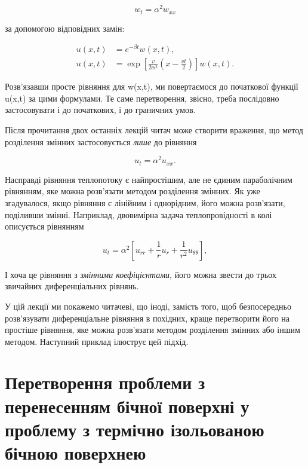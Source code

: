 \documentclass[
  ukrainian,
]{article}
\begin{document}
\[
w_t = \alpha^2 w_{xx}
\]

за допомогою відповідних замін:

\[
\begin{aligned}
u(x,t)&=e^{-\beta t}w(x,t),\\
u(x,t)&=\exp\!\left[\frac{v}{2\alpha^2}\!\left(x-\frac{vt}{2}\right)\right]w(x,t).
\end{aligned}
\]

Розв'язавши просте рівняння для w(x,t), ми повертаємося до початкової
функції u(x,t) за цими формулами. Те саме перетворення, звісно, треба
послідовно застосовувати і до початкових, і до граничних умов.

Після прочитання двох останніх лекцій читач може створити враження, що
метод розділення змінних застосовується \emph{лише} до рівняння

\[
u_t = \alpha^2 u_{xx}.
\]

Насправді рівняння теплопотоку є найпростішим, але не єдиним
параболічним рівнянням, яке можна розв'язати методом розділення змінних.
Як уже згадувалося, якщо рівняння є лінійним і однорідним, його можна
розв'язати, поділивши змінні. Наприклад, двовимірна задача
теплопровідності в колі описується рівнянням

\[
u_t = \alpha^2 \left[ u_{rr} + \frac{1}{r} u_r + \frac{1}{r^2} u_{\theta\theta} \right],
\]

І хоча це рівняння з \emph{змінними коефіцієнтами}, його можна звести до
трьох звичайних диференціальних рівнянь.

У цій лекції ми покажемо читачеві, що іноді, замість того, щоб
безпосередньо розв'язувати диференціальне рівняння в похідних, краще
перетворити його на простіше рівняння, яке можна розв'язати методом
розділення змінних або іншим методом. Наступний приклад ілюструє цей
підхід.

\section{Перетворення проблеми з перенесенням бічної поверхні у проблему
з термічно ізольованою бічною
поверхнею}\label{ux43fux435ux440ux435ux442ux432ux43eux440ux435ux43dux43dux44f-ux43fux440ux43eux431ux43bux435ux43cux438-ux437-ux43fux435ux440ux435ux43dux435ux441ux435ux43dux43dux44fux43c-ux431ux456ux447ux43dux43eux457-ux43fux43eux432ux435ux440ux445ux43dux456-ux443-ux43fux440ux43eux431ux43bux435ux43cux443-ux437-ux442ux435ux440ux43cux456ux447ux43dux43e-ux456ux437ux43eux43bux44cux43eux432ux430ux43dux43eux44e-ux431ux456ux447ux43dux43eux44e-ux43fux43eux432ux435ux440ux445ux43dux435ux44e}
\end{document}
